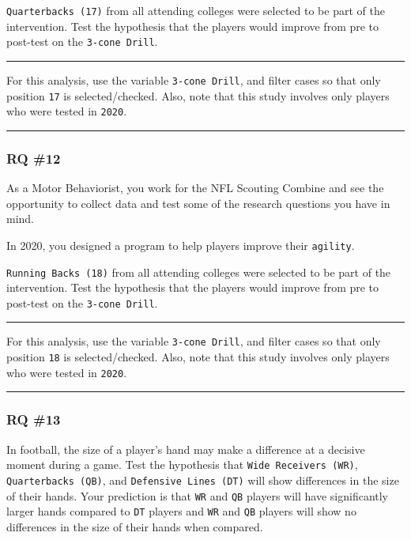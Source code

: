\documentclass[
]{article}
\begin{document}
\texttt{Quarterbacks\ (17)} from all attending colleges were selected to be part of the intervention. Test the hypothesis that the players would improve from pre to post-test on the \texttt{3-cone\ Drill}.

\begin{center}\rule{0.5\linewidth}{0.5pt}\end{center}

For this analysis, use the variable \texttt{3-cone\ Drill}, and filter cases so that only position \texttt{17} is selected/checked. Also, note that this study involves only players who were tested in \texttt{2020}.

\begin{center}\rule{0.5\linewidth}{0.5pt}\end{center}

\hypertarget{rq-12}{%
\subsubsection{RQ \#12}\label{rq-12}}

As a Motor Behaviorist, you work for the NFL Scouting Combine and see the opportunity to collect data and test some of the research questions you have in mind.

In 2020, you designed a program to help players improve their \texttt{agility}.

\texttt{Running\ Backs\ (18)} from all attending colleges were selected to be part of the intervention. Test the hypothesis that the players would improve from pre to post-test on the \texttt{3-cone\ Drill}.

\begin{center}\rule{0.5\linewidth}{0.5pt}\end{center}

For this analysis, use the variable \texttt{3-cone\ Drill}, and filter cases so that only position \texttt{18} is selected/checked. Also, note that this study involves only players who were tested in \texttt{2020}.

\begin{center}\rule{0.5\linewidth}{0.5pt}\end{center}

\hypertarget{rq-13}{%
\subsubsection{RQ \#13}\label{rq-13}}

In football, the size of a player's hand may make a difference at a decisive moment during a game. Test the hypothesis that \texttt{Wide\ Receivers\ (WR)}, \texttt{Quarterbacks\ (QB)}, and \texttt{Defensive\ Lines\ (DT)} will show differences in the size of their hands. Your prediction is that \texttt{WR} and \texttt{QB} players will have significantly larger hands compared to \texttt{DT} players and \texttt{WR} and \texttt{QB} players will show no differences in the size of their hands when compared.
\end{document}
